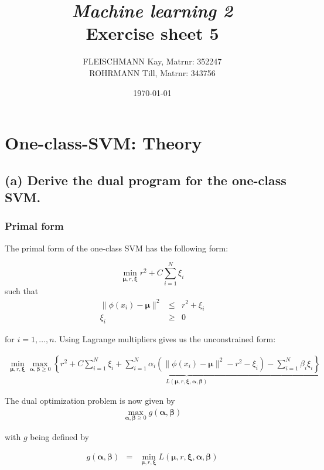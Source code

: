 \documentclass[a4paper, 12pt, titlepage]{article}
\title
{{\em Machine learning 2}\\
Exercise sheet 5}
\author{FLEISCHMANN Kay, Matrnr: 352247\\
	ROHRMANN Till, Matrnr: 343756}
\date{\today}
\newcommand{\norm}[1]{\lVert#1\rVert}
\begin{document}
\maketitle

\section{One-class-SVM: Theory}
\subsection*{(a) Derive the dual program for the one-class SVM.}
\subsubsection*{Primal form}

The primal form of the one-class SVM has the following form:

\begin{equation*}
	\min_{\boldsymbol{\mu},r,\boldsymbol{\xi}} r^2 + C\sum_{i=1}^N \xi_i
\end{equation*}
such that
\begin{eqnarray*}
	\norm{\phi(x_i)-\boldsymbol{\mu}}^2 &\le& r^2 + \xi_i\\
	\xi_i &\ge& 0
\end{eqnarray*}

for $i=1,\ldots,n$. Using Lagrange multipliers gives us the unconstrained form:

\begin{eqnarray*}
	\min_{\boldsymbol{\mu},r,\boldsymbol{\xi}}\max_{\boldsymbol{\alpha},\boldsymbol{\beta} \ge 0} \underbrace{ \left\{ r^2 + C\sum_{i=1}^N \xi_i + \sum_{i=1}^N \alpha_i \left( \norm{\phi(x_i)-\boldsymbol{\mu}}^2 -r^2 - \xi_i\right) -\sum_{i=1}^N \beta_i \xi_i\right\}}_{L(\boldsymbol{\mu},r,\boldsymbol{\xi},\boldsymbol{\alpha},\boldsymbol{\beta})} 
\end{eqnarray*}

The dual optimization problem is now given by 
\begin{eqnarray*}
	\max_{\boldsymbol{\alpha},\boldsymbol{\beta} \ge 0} g(\boldsymbol{\alpha},\boldsymbol{\beta})
\end{eqnarray*}

with $g$ being defined by

\begin{eqnarray}
	g(\boldsymbol{\alpha},\boldsymbol{\beta}) &=& \min_{\boldsymbol{\mu},r,\boldsymbol{\xi}} L(\boldsymbol{\mu},r,\boldsymbol{\xi},\boldsymbol{\alpha},\boldsymbol{\beta}) \label{eq:g}
\end{eqnarray}
\end{document}
